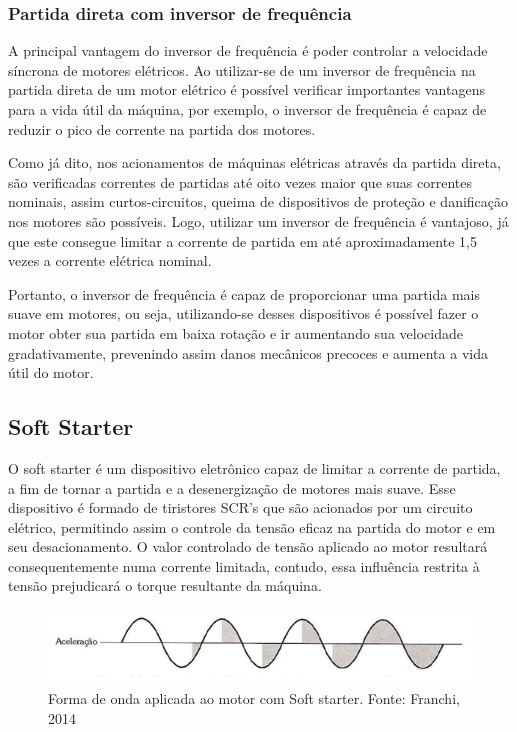 \documentclass[a4paper, 12pt,oneside, english, brazil]{abntex2}
\begin{document}
\subsubsection{Partida direta com inversor de frequência}

A principal vantagem do inversor de frequência é poder controlar a velocidade síncrona de motores elétricos. Ao utilizar-se de um inversor de frequência na partida direta de um motor elétrico é possível verificar importantes vantagens para a vida útil da máquina, por exemplo, o inversor de frequência é capaz de reduzir o pico de corrente na partida dos motores. 

Como já dito, nos acionamentos de máquinas elétricas através da partida direta, são verificadas correntes de partidas até oito vezes maior que suas correntes nominais, assim curtos-circuitos, queima de dispositivos de proteção e danificação nos motores são possíveis. Logo, utilizar um inversor de frequência é vantajoso, já que este consegue limitar a corrente de partida em até aproximadamente 1,5 vezes a corrente elétrica nominal.

Portanto, o inversor de frequência é capaz de proporcionar uma partida mais suave em motores, ou seja, utilizando-se desses dispositivos é possível fazer o motor obter sua partida em baixa rotação e ir aumentando sua velocidade gradativamente, prevenindo assim danos mecânicos precoces e aumenta a vida útil do motor.

\subsection{Soft Starter}
O soft starter é um dispositivo eletrônico capaz de limitar a corrente de partida, a fim de tornar a partida e a desenergização de motores mais suave. Esse dispositivo é formado de tiristores SCR’s que são acionados por um circuito elétrico, permitindo assim o controle da tensão eficaz na partida do motor e em seu desacionamento. O valor controlado de tensão aplicado ao motor resultará consequentemente numa corrente limitada, contudo, essa influência restrita à tensão prejudicará o torque resultante da máquina.

\begin{figure}[H]
    \centering
    \includegraphics[scale=0.8]{soft.png}
    \caption{Forma de onda aplicada ao motor com Soft starter. Fonte: Franchi, 2014}
    \label{SOFT}
\end{figure}
\end{document}
